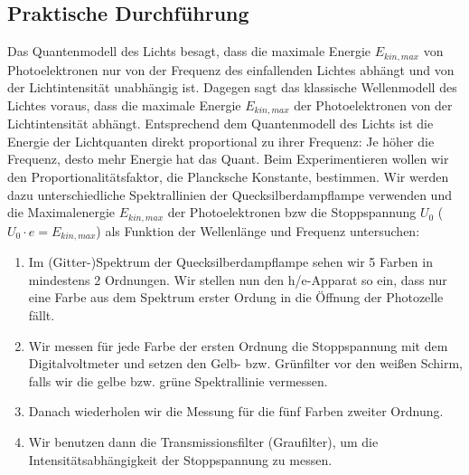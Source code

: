 \documentclass[12px]{scrartcl}
\begin{document}
\subsection{Praktische Durchführung}
Das Quantenmodell des Lichts besagt, dass die maximale Energie $E_{kin,max}$ von Photoelektronen nur von der Frequenz des einfallenden Lichtes abhängt und von der Lichtintensität unabhängig ist.
Dagegen sagt das klassische Wellenmodell des Lichtes voraus, dass die maximale Energie $E_{kin,max}$ der Photoelektronen von der Lichtintensität abhängt.
Entsprechend dem Quantenmodell des Lichts ist die Energie der Lichtquanten direkt proportional zu ihrer Frequenz: Je höher die Frequenz, desto mehr Energie hat das Quant. Beim Experimentieren wollen wir den Proportionalitätsfaktor, die Plancksche Konstante, bestimmen.
Wir werden dazu unterschiedliche Spektrallinien der Quecksilberdampflampe verwenden und die Maximalenergie $E_{kin,max}$ der Photoelektronen bzw die Stoppspannung $U_0$ ($U_0\cdot e = E_{kin,max}$) als Funktion der Wellenlänge und Frequenz untersuchen:
\begin{enumerate}
\item Im (Gitter-)Spektrum der Quecksilberdampflampe sehen wir 5 Farben in mindestens 2 Ordnungen.
Wir stellen nun den h/e-Apparat so ein, dass nur eine Farbe aus dem Spektrum erster Ordung in die Öffnung der Photozelle fällt.
\item Wir messen für jede Farbe der ersten Ordnung die Stoppspannung mit dem Digitalvoltmeter und setzen den
Gelb- bzw. Grünfilter vor den weißen Schirm, falls wir die gelbe bzw. grüne Spektrallinie vermessen.
\item Danach wiederholen wir die Messung für die fünf Farben zweiter Ordnung.
\item Wir benutzen dann die Transmissionsfilter (Graufilter), um die Intensitätsabhängigkeit der Stoppspannung zu messen.
\end{enumerate}
\end{document}
